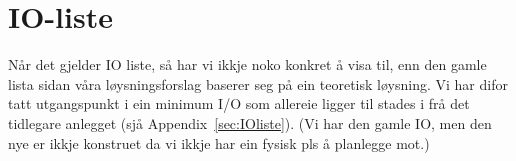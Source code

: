 \section{IO-liste}
\thispagestyle{fancy}

Når det gjelder \gls{IO} liste, så har vi ikkje noko konkret å visa til, enn den gamle lista sidan våra løysningsforslag baserer seg på ein teoretisk løysning.
Vi har difor tatt utgangspunkt i ein minimum I/O som allereie ligger til stades i frå det tidlegare anlegget (sjå Appendix~\ref{sec:IOliste}). 
(Vi har den gamle IO, men den nye er ikkje konstruet da vi ikkje har ein fysisk pls å planlegge mot.)

%
%




